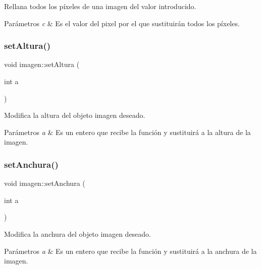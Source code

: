 Rellana todos los píxeles de una imagen del valor introducido. 
\begin{DoxyParams}{Parámetros}
{\em c} & Es el valor del pixel por el que sustituirán todos los píxeles. \\
\hline
\end{DoxyParams}
\mbox{\label{classimagen_ac1cfc220563159e05f7cd0c46bd1d131}} 
\subsubsection{\texorpdfstring{set\+Altura()}{setAltura()}}
{\footnotesize\ttfamily void imagen\+::set\+Altura (\begin{DoxyParamCaption}\item[{int}]{a }\end{DoxyParamCaption})}

Modifica la altura del objeto imagen deseado. 
\begin{DoxyParams}{Parámetros}
{\em a} & Es un entero que recibe la función y sustituirá a la altura de la imagen. \\
\hline
\end{DoxyParams}
\mbox{\label{classimagen_ad3779670d1436bbe5fd566458947aaeb}} 
\subsubsection{\texorpdfstring{set\+Anchura()}{setAnchura()}}
{\footnotesize\ttfamily void imagen\+::set\+Anchura (\begin{DoxyParamCaption}\item[{int}]{a }\end{DoxyParamCaption})}

Modifica la anchura del objeto imagen deseado. 
\begin{DoxyParams}{Parámetros}
{\em a} & Es un entero que recibe la función y sustituirá a la anchura de la imagen. \\
\hline
\end{DoxyParams}
\mbox{\label{classimagen_ae6a817d007321a39b9546f0ce665b00c}} 
